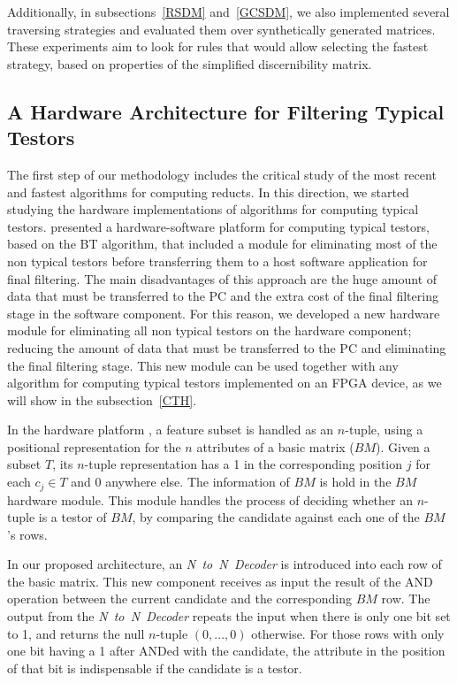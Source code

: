 \documentclass[authoryear,11pt]{elsarticle}
\begin{document}
	Additionally, in subsections~\ref{RSDM} and~\ref{GCSDM}, we also implemented several traversing strategies and 
	evaluated them over synthetically generated matrices. These experiments aim to look for rules that would allow 
	selecting the fastest strategy, based on properties of the simplified discernibility matrix.
	
\subsection{A Hardware Architecture for Filtering Typical Testors}\label{OnlyTT}
	The first step of our methodology includes the critical study of the most recent and fastest algorithms for 
	computing reducts. In this direction, we started studying the hardware implementations of algorithms for 
	computing typical testors. \cite{Rojas12} presented a hardware-software platform for computing typical testors,
	based on the BT algorithm, that included a module for eliminating most of the non typical testors before 
	transferring them to a host software application for final filtering. 
	The main disadvantages of this approach are the huge amount of data that must be transferred to the PC and 
	the extra cost of the final filtering stage in the software component.  
	For this reason, we developed a new hardware module for eliminating all non typical testors on the hardware
	component; reducing the amount of data that must be transferred to the PC and eliminating the final filtering
	stage. 	
	This new module can be used together with any algorithm for computing typical testors implemented on an FPGA 
	device, as we will show in the subsection~\ref{CTH}.
	
	In the hardware platform \citep{Rojas12}, a feature subset is handled as an $n$-tuple, using a positional 
	representation for the $n$ attributes of a basic matrix ($BM$). Given a subset $T$, its $n$-tuple 
	representation has a 1 in the corresponding position $j$ for each $c_j \in T$ and 0 anywhere else.
	The information of $BM$ is hold in the $BM$ hardware module. This module handles the process of 
	deciding whether an $n$-tuple is a testor of $BM$, by comparing the candidate against each one of the 
	$BM$'s rows.

	In our proposed architecture, an \textit{N~to~N~Decoder} is introduced into each 
	row of the basic matrix. This new component receives as input 
	the result of the AND operation between the current candidate and the corresponding $BM$ row.
	The output from the \textit{N~to~N~Decoder} repeats the input when there is only one bit set
	to 1, and returns the null $n$-tuple $(0,...,0)$ otherwise. For those rows with only one bit having a 
	1 after ANDed with the candidate, the attribute in the position of that bit is indispensable if the 
	candidate is a testor.
	
\end{document}
